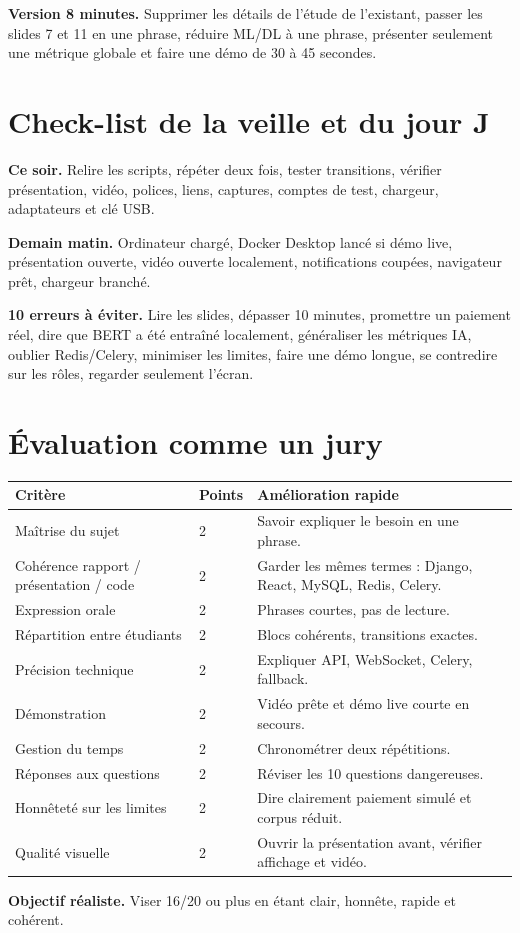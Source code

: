 \documentclass[11pt,a4paper]{article}
\begin{document}
\textbf{Version 8 minutes.} Supprimer les détails de l'étude de l'existant, passer les slides 7 et 11 en une phrase, réduire ML/DL à une phrase, présenter seulement une métrique globale et faire une démo de 30 à 45 secondes.

\section{Check-list de la veille et du jour J}

\textbf{Ce soir.} Relire les scripts, répéter deux fois, tester transitions, vérifier présentation, vidéo, polices, liens, captures, comptes de test, chargeur, adaptateurs et clé USB.

\textbf{Demain matin.} Ordinateur chargé, Docker Desktop lancé si démo live, présentation ouverte, vidéo ouverte localement, notifications coupées, navigateur prêt, chargeur branché.

\textbf{10 erreurs à éviter.} Lire les slides, dépasser 10 minutes, promettre un paiement réel, dire que BERT a été entraîné localement, généraliser les métriques IA, oublier Redis/Celery, minimiser les limites, faire une démo longue, se contredire sur les rôles, regarder seulement l'écran.

\section{Évaluation comme un jury}

\begin{longtable}{p{5cm}p{2cm}p{8cm}}
\toprule
\textbf{Critère} & \textbf{Points} & \textbf{Amélioration rapide}\\
\midrule
Maîtrise du sujet & 2 & Savoir expliquer le besoin en une phrase.\\
Cohérence rapport / présentation / code & 2 & Garder les mêmes termes : Django, React, MySQL, Redis, Celery.\\
Expression orale & 2 & Phrases courtes, pas de lecture.\\
Répartition entre étudiants & 2 & Blocs cohérents, transitions exactes.\\
Précision technique & 2 & Expliquer API, WebSocket, Celery, fallback.\\
Démonstration & 2 & Vidéo prête et démo live courte en secours.\\
Gestion du temps & 2 & Chronométrer deux répétitions.\\
Réponses aux questions & 2 & Réviser les 10 questions dangereuses.\\
Honnêteté sur les limites & 2 & Dire clairement paiement simulé et corpus réduit.\\
Qualité visuelle & 2 & Ouvrir la présentation avant, vérifier affichage et vidéo.\\
\bottomrule
\end{longtable}

\textbf{Objectif réaliste.} Viser 16/20 ou plus en étant clair, honnête, rapide et cohérent.
\end{document}
